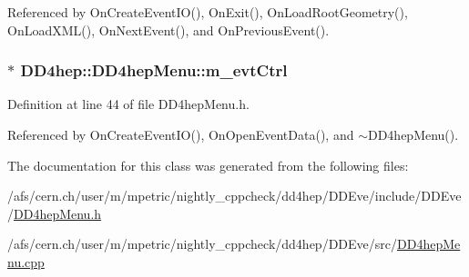 Referenced by OnCreateEventIO(), OnExit(), OnLoadRootGeometry(), OnLoadXML(), OnNextEvent(), and OnPreviousEvent().\hypertarget{class_d_d4hep_1_1_d_d4hep_menu_a3c5139077c3f664d0ab0bcde163466f6}{
\subsubsection[{m\_\-evtCtrl}]{$\ast$ {\bf DD4hep::DD4hepMenu::m\_\-evtCtrl}}}
\label{class_d_d4hep_1_1_d_d4hep_menu_a3c5139077c3f664d0ab0bcde163466f6}


Definition at line 44 of file DD4hepMenu.h.

Referenced by OnCreateEventIO(), OnOpenEventData(), and $\sim$DD4hepMenu().

The documentation for this class was generated from the following files:\begin{DoxyCompactItemize}
\item 
/afs/cern.ch/user/m/mpetric/nightly\_\-cppcheck/dd4hep/DDEve/include/DDEve/\hyperlink{_d_d4hep_menu_8h}{DD4hepMenu.h}\item 
/afs/cern.ch/user/m/mpetric/nightly\_\-cppcheck/dd4hep/DDEve/src/\hyperlink{_d_d4hep_menu_8cpp}{DD4hepMenu.cpp}\end{DoxyCompactItemize}
